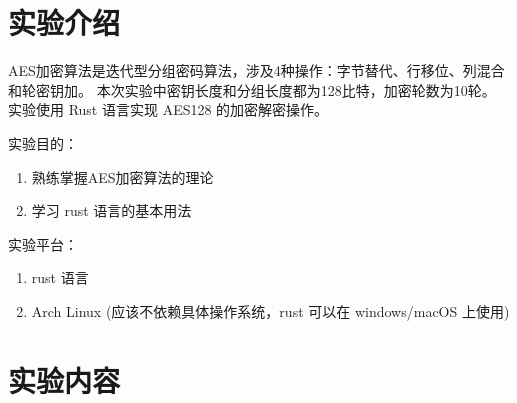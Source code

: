 \documentclass[degree=project,degree-type=project,cjk-font=noto]{thuthesis}
\begin{document}
\maketitle

\frontmatter
% 



\mainmatter

\chapter{实验介绍}
AES加密算法是迭代型分组密码算法，涉及4种操作：字节替代、行移位、列混合和轮密钥加。
本次实验中密钥长度和分组长度都为128比特，加密轮数为10轮。
实验使用 Rust 语言实现 AES128 的加密解密操作。

实验目的：

\begin{enumerate}
    \item 熟练掌握AES加密算法的理论
    \item 学习 rust 语言的基本用法
\end{enumerate}

实验平台：

\begin{enumerate}
    \item rust 语言
    \item Arch Linux (应该不依赖具体操作系统，rust 可以在 windows/macOS 上使用)
\end{enumerate}

\chapter{实验内容}
\end{document}
